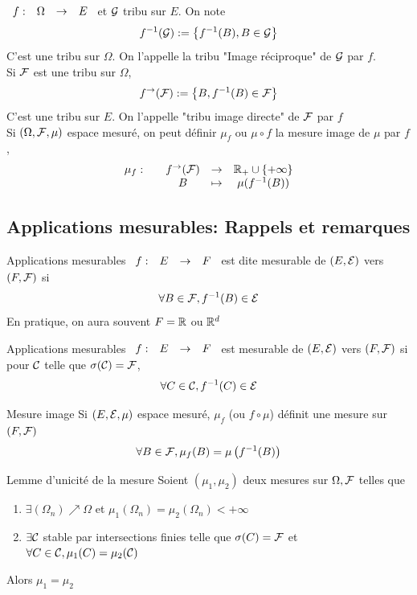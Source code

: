 \documentclass[]{report}
\begin{document}
\begin{prop}{}{}
    $\begin{array}{ccccc} f : & \Omega & \to & E \end{array}$ et $\mathcal{G}$ tribu sur $E$. On note
    \[f^{-1}(\mathcal{G}):=\left\{f^{-1}(B),B\in \mathcal{G}\right\}\]
    C'est une tribu sur $\Omega$. On l'appelle la tribu "Image réciproque" de $\mathcal{G}$ par $f$.\\
    Si $\mathcal{F}$ est une tribu sur $\Omega$,
    \[f^{\to}(\mathcal{F}):=\left\{B,f^{-1}(B)\in \mathcal{F}\right\}\]
    C'est une tribu sur $E$. On l'appelle "tribu image directe" de $\mathcal{F}$ par $f$\\
    Si $(\Omega,\mathcal{F},\mu)$ espace mesuré, on peut définir $\mu_f$ ou $\mu\circ f$ la mesure image de $\mu$ par $f$,
    \[\begin{array}{ccccc} \mu_f : & & f^{\to}(\mathcal{F}) & \to & \mathbb{R}_+\cup \{+\infty\} \\ & & B & \mapsto & \mu(f^{-1}(B)) \end{array}\]
\end{prop}

\subsection{Applications mesurables: Rappels et remarques}

\begin{df}{Applications mesurables}{}
    $\begin{array}{ccccc} f : & E & \to & F \end{array}$ est dite mesurable de $(E,\mathcal{E})$ vers $(F,\mathcal{F})$ si
    \[\forall B\in \mathcal{F}, f^{-1}(B)\in \mathcal{E}\]
    En pratique, on aura souvent $F=\mathbb{R}$ ou $\mathbb{R}^d$
\end{df}

\begin{prop}{Applications mesurables}{}
    $\begin{array}{ccccc} f : & E & \to & F \end{array}$ est mesurable de $(E,\mathcal{E})$ vers $(F,\mathcal{F})$ si pour $\mathcal{C}$ telle que $\sigma(\mathcal{C})=\mathcal{F}$,
    \[\forall C\in \mathcal{C}, f^{-1}(C)\in \mathcal{E}\]
\end{prop}

\begin{dfprop}{Mesure image}{}
    Si $(E,\mathcal{E},\mu)$ espace mesuré, $\mu_f$ (ou $f\circ \mu$) définit une mesure sur $(F,\mathcal{F})$
    \[\forall B\in \mathcal{F}, \mu_f(B)=\mu\left(f^{-1}(B)\right)\]
\end{dfprop}

\begin{lm}{Lemme d'unicité de la mesure}{}
    Soient $(\mu_1,\mu_2)$ deux mesures sur $\Omega,\mathcal{F}$ telles que
    \begin{enumerate}
        \item $\exists (\Omega_n)\nearrow \Omega$ et $\mu_1(\Omega_n)=\mu_2(\Omega_n)<+\infty$
        \item $\exists \mathcal{C}$ stable par intersections finies telle que $\sigma(C)=\mathcal{F}$ et $\forall C\in \mathcal{C},\mu_1(C)=\mu_2(\mathcal{C})$
    \end{enumerate}
    Alors $\mu_1=\mu_2$
\end{lm}
\end{document}
